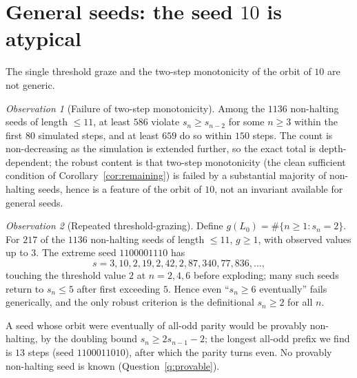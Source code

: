 \documentclass[11pt,reqno]{amsart}
\theoremstyle{plain}
\theoremstyle{definition}
\theoremstyle{remark}
\newtheorem{observation}{Observation}
\begin{document}
\section{General seeds: the seed $10$ is atypical}\label{sec:general}
The single threshold graze and the two-step monotonicity of the orbit of $10$ are not generic.

\begin{observation}[Failure of two-step monotonicity]\label{obs:mono}
Among the $1136$ non-halting seeds of length $\le 11$, at least $586$ violate $s_n\ge s_{n-2}$ for some $n\ge 3$ within the first $80$ simulated steps, and at least $659$ do so within $150$ steps. The count is non-decreasing as the simulation is extended further, so the exact total is depth-dependent; the robust content is that two-step monotonicity (the clean sufficient condition of Corollary~\ref{cor:remaining}) is failed by a substantial majority of non-halting seeds, hence is a feature of the orbit of $10$, not an invariant available for general seeds.
\end{observation}

\begin{observation}[Repeated threshold-grazing]\label{obs:graze}
Define $g(L_0)=\#\{n\ge 1:s_n=2\}$. For $217$ of the $1136$ non-halting seeds of length $\le 11$, $g\ge 1$, with observed values up to $3$. The extreme seed $1100001110$ has
\[ s=3,10,2,19,2,42,2,87,340,77,836,\dots, \]
touching the threshold value $2$ at $n=2,4,6$ before exploding; many such seeds return to $s_n\le 5$ after first exceeding $5$. Hence even ``$s_n\ge 6$ eventually'' fails generically, and the only robust criterion is the definitional $s_n\ge 2$ for all $n$.
\end{observation}

A seed whose orbit were eventually of all-odd parity would be provably non-halting, by the doubling bound $s_n\ge 2s_{n-1}-2$; the longest all-odd prefix we find is $13$ steps (seed $1100011010$), after which the parity turns even. No provably non-halting seed is known (Question~\ref{q:provable}).
\end{document}
